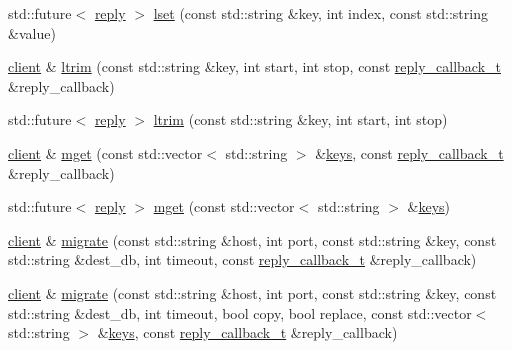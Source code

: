 \begin{DoxyCompactItemize}
\item 
std\+::future$<$ \hyperlink{classcpp__redis_1_1reply}{reply} $>$ \hyperlink{classcpp__redis_1_1client_a4c0d3955450ed6bda887688c863baa72}{lset} (const std\+::string \&key, int index, const std\+::string \&value)
\item 
\hyperlink{classcpp__redis_1_1client}{client} \& \hyperlink{classcpp__redis_1_1client_af82304129513a073988583fcfa4210fe}{ltrim} (const std\+::string \&key, int start, int stop, const \hyperlink{classcpp__redis_1_1client_a061a1140d36d2eaeda82b09a0bb3f9f2}{reply\+\_\+callback\+\_\+t} \&reply\+\_\+callback)
\item 
std\+::future$<$ \hyperlink{classcpp__redis_1_1reply}{reply} $>$ \hyperlink{classcpp__redis_1_1client_af14f81093a0e6e45d958e9b7a5ed9c16}{ltrim} (const std\+::string \&key, int start, int stop)
\item 
\hyperlink{classcpp__redis_1_1client}{client} \& \hyperlink{classcpp__redis_1_1client_a946b590d9a2a29ee6ae1971b9208a241}{mget} (const std\+::vector$<$ std\+::string $>$ \&\hyperlink{classcpp__redis_1_1client_acb7845a206b2321e6919c2f38282c322}{keys}, const \hyperlink{classcpp__redis_1_1client_a061a1140d36d2eaeda82b09a0bb3f9f2}{reply\+\_\+callback\+\_\+t} \&reply\+\_\+callback)
\item 
std\+::future$<$ \hyperlink{classcpp__redis_1_1reply}{reply} $>$ \hyperlink{classcpp__redis_1_1client_a8c08062c8414fd72d1a0b3ef4f44d89d}{mget} (const std\+::vector$<$ std\+::string $>$ \&\hyperlink{classcpp__redis_1_1client_acb7845a206b2321e6919c2f38282c322}{keys})
\item 
\hyperlink{classcpp__redis_1_1client}{client} \& \hyperlink{classcpp__redis_1_1client_acfbf3cb40c0cd532e42d725bbda9a03a}{migrate} (const std\+::string \&host, int port, const std\+::string \&key, const std\+::string \&dest\+\_\+db, int timeout, const \hyperlink{classcpp__redis_1_1client_a061a1140d36d2eaeda82b09a0bb3f9f2}{reply\+\_\+callback\+\_\+t} \&reply\+\_\+callback)
\item 
\hyperlink{classcpp__redis_1_1client}{client} \& \hyperlink{classcpp__redis_1_1client_a671442669b8fe540bfc7d02c05a74207}{migrate} (const std\+::string \&host, int port, const std\+::string \&key, const std\+::string \&dest\+\_\+db, int timeout, bool copy, bool replace, const std\+::vector$<$ std\+::string $>$ \&\hyperlink{classcpp__redis_1_1client_acb7845a206b2321e6919c2f38282c322}{keys}, const \hyperlink{classcpp__redis_1_1client_a061a1140d36d2eaeda82b09a0bb3f9f2}{reply\+\_\+callback\+\_\+t} \&reply\+\_\+callback)
\item 

\end{DoxyCompactItemize}
